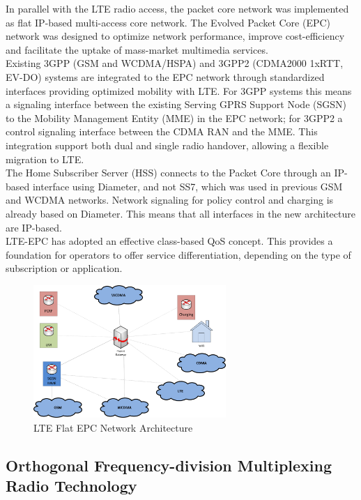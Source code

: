 In parallel with the LTE radio access, the packet core network was implemented as
flat IP-based multi-access core network. The Evolved Packet Core (EPC) network was
designed to optimize network performance, improve cost-efficiency and facilitate
the uptake of mass-market multimedia services.\\

Existing 3GPP (GSM and WCDMA/HSPA) and 3GPP2 (CDMA2000 1xRTT, EV-DO) systems are
integrated to the EPC network through standardized interfaces providing optimized
mobility with LTE. For 3GPP systems this means a signaling interface between the
existing Serving GPRS Support Node (SGSN) to the Mobility Management Entity (MME)
in the EPC network; for 3GPP2 a control signaling interface between the CDMA RAN
and the MME. This integration support both dual and single radio handover, allowing
a flexible migration to LTE.\\

The Home Subscriber Server (HSS) connects to the Packet Core through an IP-based
interface using Diameter, and not SS7, which was used in previous GSM and WCDMA
networks. Network signaling for policy control and charging is already based on
Diameter. This means that all interfaces in the new architecture are IP-based.\\

LTE-EPC has adopted an effective class-based QoS concept. This provides a
foundation for operators to offer service differentiation, depending on the type
of subscription or application.

\begin{figure}[htbp]
    \centering
    \includegraphics[width=0.65\textwidth]{./figures/lte_flatepc}
    \caption{ LTE Flat EPC Network Architecture
    \label{fig:lteflatepc}}
\end{figure}

\subsection{Orthogonal Frequency-division Multiplexing Radio Technology} %

